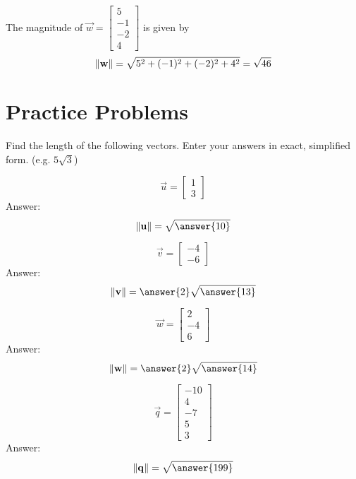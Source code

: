 \documentclass{ximera}
\begin{document}
\begin{example}\label{ex:findnorminr4}
The magnitude of $\vec{w}=\begin{bmatrix}5\\ -1\\ -2\\ 4\end{bmatrix}$ is given by
 $$\left\lVert\mathbf{w}\right\rVert=\sqrt{5^2+(-1)^2+(-2)^2+4^2}=\sqrt{46}$$ 
\end{example}

\section*{Practice Problems}
\begin{problem}\label{prob:magnitude}
Find the length of the following vectors.  Enter your answers in exact, simplified form. (e.g. $5\sqrt{3}$)
\begin{problem}\label{prob:magnitude1}
 $$\vec{u}=\begin{bmatrix}1\\3\end{bmatrix}$$ 
 Answer:
 $$\norm{\vec{u}}=\sqrt{\answer{10}}$$
 \end{problem}
 
 \begin{problem}\label{prob:magnitude2}
 $$\vec{v}=\begin{bmatrix}-4\\-6\end{bmatrix}$$
 Answer:
 $$\norm{\vec{v}}=\answer{2}\sqrt{\answer{13}}$$
 \end{problem}
 
 \begin{problem}\label{prob:magnitude3}
 $$\vec{w}=\begin{bmatrix}2\\-4\\6\end{bmatrix}$$
 Answer:
 $$\norm{\vec{w}}=\answer{2}\sqrt{\answer{14}}$$
 \end{problem}
 
 \begin{problem}\label{prob:magnitude4}
 $$\vec{q}=\begin{bmatrix}-10\\ 4\\ -7\\ 5\\ 3\end{bmatrix}$$
 Answer:
 $$\norm{\vec{q}}=\sqrt{\answer{199}}$$
 \end{problem}
 \end{problem}
 
\end{document}
